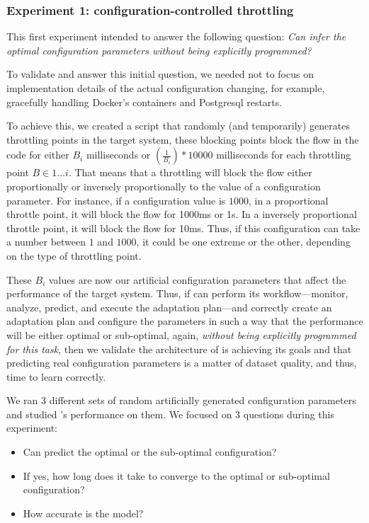 \subsubsection{Experiment 1: configuration-controlled throttling}

This first experiment intended to answer the following question: \emph{Can \projectname{} infer the optimal configuration parameters without being explicitly programmed?}

To validate and answer this initial question, we needed not to focus on implementation details of the actual configuration changing, for example, gracefully handling Docker's containers and Postgresql restarts.

To achieve this, we created a script that randomly (and temporarily) generates throttling points in the target system, these blocking points block the flow in the code for either $B_i$ milliseconds or $(\frac{1}{B_i}) * 10000$ milliseconds for each throttling point $B \in 1 \dots i$. That means that a throttling will block the flow either proportionally or inversely proportionally to the value of a configuration parameter. For instance, if a configuration value is $1000$, in a proportional throttle point, it will block the flow for 1000ms or 1s. In a inversely proportional throttle point, it will block the flow for 10ms. Thus, if this configuration can take a number between $1$ and $1000$, it could be one extreme or the other, depending on the type of throttling point.

These $B_i$ values are now our artificial configuration parameters that affect the performance of the target system. Thus, if \projectname{} can perform its workflow---monitor, analyze, predict, and execute the adaptation plan---and correctly create an adaptation plan and configure the parameters in such a way that the performance will be either optimal or sub-optimal, again, \emph{without being explicitly programmed for this task}, then we validate the architecture of \projectname{} is achieving its goals and that predicting real configuration parameters is a matter of dataset quality, and thus, time to learn correctly.

We ran 3 different sets of random artificially generated configuration parameters and studied \projectname{}'s performance on them. We focused on 3 questions during this experiment:

\begin{itemize}
  \item Can \projectname{} predict the optimal or the sub-optimal configuration?
  \item If yes, how long does it take to converge to the optimal or sub-optimal configuration?
  \item How accurate is the model?
\end{itemize}

